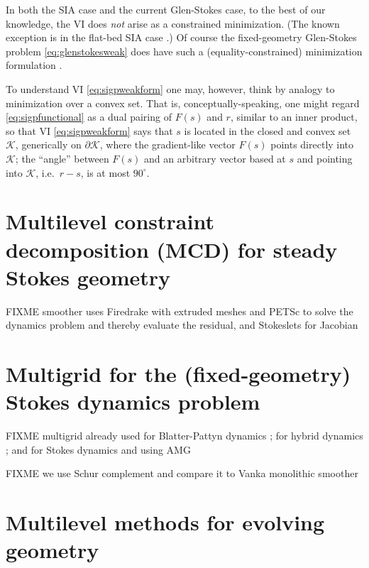 \documentclass[letterpaper,final,12pt,reqno]{amsart}
\theoremstyle{claim}
\numberwithin{equation}{section}
\numberwithin{figure}{section}
\numberwithin{table}{section}
\numberwithin{theorem}{section}
\begin{document}
In both the SIA case and the current Glen-Stokes case, to the best of our knowledge, the VI does \emph{not} arise as a constrained minimization.  (The known exception is in the flat-bed SIA case \cite{JouvetBueler2012}.)  Of course the fixed-geometry Glen-Stokes problem \eqref{eq:glenstokesweak} does have such a (equality-constrained) minimization formulation \cite{Elmanetal2014,JouvetRappaz2011}.

To understand VI \eqref{eq:sigpweakform} one may, however, think by analogy to minimization over a convex set.  That is, conceptually-speaking, one might regard \eqref{eq:sigpfunctional} as a dual pairing of $F(s)$ and $r$, similar to an inner product, so that VI \eqref{eq:sigpweakform} says that $s$ is located in the closed and convex set $\mathcal{K}$, generically on $\partial\mathcal{K}$, where the gradient-like vector $F(s)$ points directly into $\mathcal{K}$; the ``angle'' between $F(s)$ and an arbitrary vector based at $s$ and pointing into $\mathcal{K}$, i.e.~$r-s$, is at most $90^\circ$.



\section{Multilevel constraint decomposition (MCD) for steady Stokes geometry} \label{sec:mcdstokes}

FIXME smoother uses Firedrake \cite{Alnaesetal2014,Rathgeberetal2016} with extruded meshes \cite{Gibsonetal2019,McRaeetal2016} and PETSc \cite{Balayetal2020,Bueler2021} to solve the dynamics problem and thereby evaluate the residual, and Stokeslets for Jacobian

\section{Multigrid for the (fixed-geometry) Stokes dynamics problem} \label{sec:stokesdynamics}

FIXME multigrid already used for Blatter-Pattyn dynamics \cite{BrownSmithAhmadia2013}; for hybrid dynamics \cite{Jouvetetal2013,JouvetGraeser2013}; and for Stokes dynamics \cite{IsaacStadlerGhattas2015} and \cite{Tuminaroetal2016} using AMG

FIXME we use Schur complement \cite{Bueler2021,Elmanetal2014} and compare it to Vanka monolithic smoother \cite{Farrelletal2019}

\section{Multilevel methods for evolving geometry} \label{sec:stokesevolution}
\end{document}
